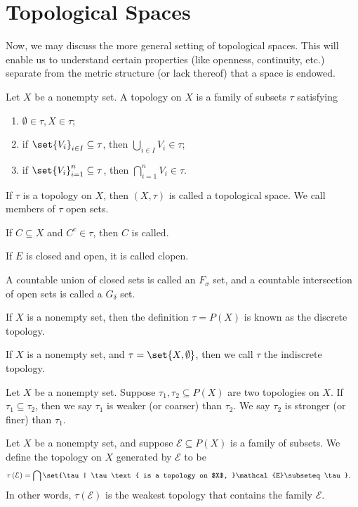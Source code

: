 \section{Topological Spaces}%
Now, we may discuss the more general setting of topological spaces. This will enable us to understand certain properties (like openness, continuity, etc.) separate from the metric structure (or lack thereof) that a space is endowed.
\begin{definition}
  Let $X$ be a nonempty set. A topology on $X$ is a family of subsets $\tau$ satisfying
  \begin{enumerate}[(1)]
    \item $\emptyset\in \tau,X\in \tau$;
    \item if $\set{V_i}_{i\in I}\subseteq \tau$, then $\bigcup_{i\in I}V_i\in \tau$;
    \item if $\set{V_i}_{i=1}^{n}\subseteq \tau$, then $\bigcap_{i=1}^{n}V_i \in \tau$.
  \end{enumerate}
  If $\tau$ is a topology on $X$, then $\left(X,\tau\right)$ is called a topological space. We call members of $\tau$ open sets.\newline

  If $C\subseteq X$ and $C^{c}\in \tau$, then $C$ is called.\newline

  If $E$ is closed and open, it is called clopen.\newline

  A countable union of closed sets is called an $F_{\sigma}$ set, and a countable intersection of open sets is called a $G_{\delta}$ set.
\end{definition}
\begin{definition}
  If $X$ is a nonempty set, then the definition $\tau = P(X)$ is known as the discrete topology.\newline

  If $X$ is a nonempty set, and $\tau = \set{X,\emptyset}$, then we call $\tau$ the indiscrete topology.
\end{definition}
\begin{definition}
  Let $X$ be a nonempty set. Suppose $\tau_1,\tau_2\subseteq P(X)$ are two topologies on $X$. If $\tau_1\subseteq \tau_2$, then we say $\tau_1$ is weaker (or coarser) than $\tau_2$. We say $\tau_2$ is stronger (or finer) than $\tau_1$.
\end{definition}
\begin{definition}
  Let $X$ be a nonempty set, and suppose $\mathcal{E}\subseteq P(X)$ is a family of subsets. We define the topology on $X$ generated by $\mathcal{E}$ to be
  \begin{align*}
    \tau\left(\mathcal{E}\right) &= \bigcap\set{\tau | \tau\text{ is a topology on $X$, }\mathcal{E}\subseteq \tau}.
  \end{align*}
  In other words, $\tau\left(\mathcal{E}\right)$ is the weakest topology that contains the family $\mathcal{E}$.
\end{definition}
